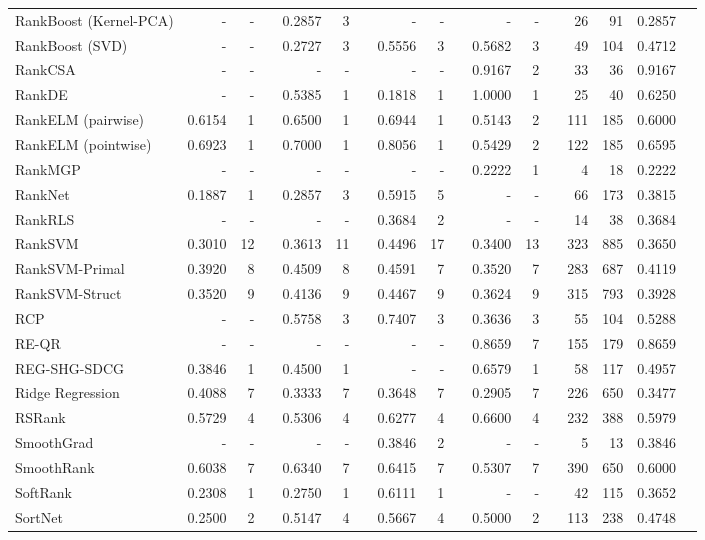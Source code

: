 \documentclass{sig-alternate}
\begin{document}
\begin{longtable}[!hp]{@{}lrrrrrrrrrrrrrrrr@{}}
RankBoost (Kernel-PCA) & - & - && 0.2857 & 3 && - & - && - & - && 26 & 91 & 0.2857 \\
RankBoost (SVD) & - & - && 0.2727 & 3 && 0.5556 & 3 && 0.5682 & 3 && 49 & 104 & 0.4712 \\
RankCSA & - & - && - & - && - & - && 0.9167 & 2 && 33 & 36 & 0.9167 \\
RankDE & - & - && 0.5385 & 1 && 0.1818 & 1 && 1.0000 & 1 && 25 & 40 & 0.6250 \\
RankELM (pairwise) & 0.6154 & 1 && 0.6500 & 1 && 0.6944 & 1 && 0.5143 & 2 && 111 & 185 & 0.6000 \\
RankELM (pointwise) & 0.6923 & 1 && 0.7000 & 1 && 0.8056 & 1 && 0.5429 & 2 && 122 & 185 & 0.6595 \\
RankMGP & - & - && - & - && - & - && 0.2222 & 1 && 4 & 18 & 0.2222 \\
RankNet & 0.1887 & 1 && 0.2857 & 3 && 0.5915 & 5 && - & - && 66 & 173 & 0.3815 \\
RankRLS & - & - && - & - && 0.3684 & 2 && - & - && 14 & 38 & 0.3684 \\
RankSVM & 0.3010 & 12 && 0.3613 & 11 && 0.4496 & 17 && 0.3400 & 13 && 323 & 885 & 0.3650 \\
RankSVM-Primal & 0.3920 & 8 && 0.4509 & 8 && 0.4591 & 7 && 0.3520 & 7 && 283 & 687 & 0.4119 \\
RankSVM-Struct & 0.3520 & 9 && 0.4136 & 9 && 0.4467 & 9 && 0.3624 & 9 && 315 & 793 & 0.3928 \\
RCP & - & - && 0.5758 & 3 && 0.7407 & 3 && 0.3636 & 3 && 55 & 104 & 0.5288 \\
RE-QR & - & - && - & - && - & - && 0.8659 & 7 && 155 & 179 & 0.8659 \\
REG-SHG-SDCG & 0.3846 & 1 && 0.4500 & 1 && - & - && 0.6579 & 1 && 58 & 117 & 0.4957 \\
Ridge Regression & 0.4088 & 7 && 0.3333 & 7 && 0.3648 & 7 && 0.2905 & 7 && 226 & 650 & 0.3477 \\
RSRank & 0.5729 & 4 && 0.5306 & 4 && 0.6277 & 4 && 0.6600 & 4 && 232 & 388 & 0.5979 \\
SmoothGrad & - & - && - & - && 0.3846 & 2 && - & - && 5 & 13 & 0.3846 \\
SmoothRank & 0.6038 & 7 && 0.6340 & 7 && 0.6415 & 7 && 0.5307 & 7 && 390 & 650 & 0.6000 \\
SoftRank & 0.2308 & 1 && 0.2750 & 1 && 0.6111 & 1 && - & - && 42 & 115 & 0.3652 \\
SortNet & 0.2500 & 2 && 0.5147 & 4 && 0.5667 & 4 && 0.5000 & 2 && 113 & 238 & 0.4748 \\

\end{longtable}
\end{document}
